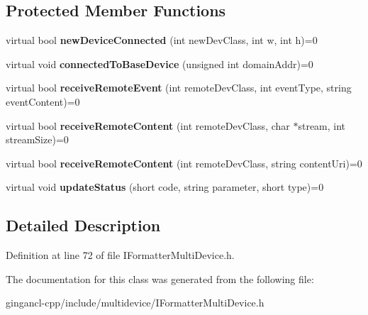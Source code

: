 \subsection*{Protected Member Functions}
\begin{CompactItemize}
\item 
virtual bool \textbf{newDeviceConnected} (int newDevClass, int w, int h)=0\label{classbr_1_1pucrio_1_1telemidia_1_1ginga_1_1ncl_1_1multidevice_1_1IFormatterMultiDevice_c789e0bb7a8b21a6bf392c8e1479cec3}

\item 
virtual void \textbf{connectedToBaseDevice} (unsigned int domainAddr)=0\label{classbr_1_1pucrio_1_1telemidia_1_1ginga_1_1ncl_1_1multidevice_1_1IFormatterMultiDevice_3af5d97a0c56f9da9a45172453022837}

\item 
virtual bool \textbf{receiveRemoteEvent} (int remoteDevClass, int eventType, string eventContent)=0\label{classbr_1_1pucrio_1_1telemidia_1_1ginga_1_1ncl_1_1multidevice_1_1IFormatterMultiDevice_d5e961b61bdbaddaae2b0933e46730ee}

\item 
virtual bool \textbf{receiveRemoteContent} (int remoteDevClass, char $\ast$stream, int streamSize)=0\label{classbr_1_1pucrio_1_1telemidia_1_1ginga_1_1ncl_1_1multidevice_1_1IFormatterMultiDevice_0a2baa43aee236e1a6592f5575c8a4a5}

\item 
virtual bool \textbf{receiveRemoteContent} (int remoteDevClass, string contentUri)=0\label{classbr_1_1pucrio_1_1telemidia_1_1ginga_1_1ncl_1_1multidevice_1_1IFormatterMultiDevice_a83a783a3e00cdfe2989ae69bed9b747}

\item 
virtual void \textbf{updateStatus} (short code, string parameter, short type)=0\label{classbr_1_1pucrio_1_1telemidia_1_1ginga_1_1ncl_1_1multidevice_1_1IFormatterMultiDevice_055eb9a79c3ce245a4c26e770bf43d50}

\end{CompactItemize}


\subsection{Detailed Description}




Definition at line 72 of file IFormatterMultiDevice.h.

The documentation for this class was generated from the following file:\begin{CompactItemize}
\item 
gingancl-cpp/include/multidevice/IFormatterMultiDevice.h\end{CompactItemize}
